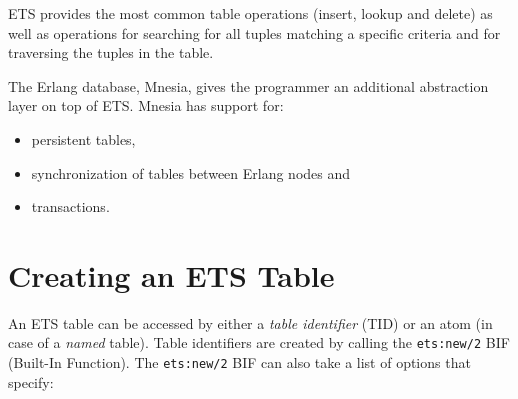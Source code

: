 \documentclass[aps,pre,preprint,nofootinbib]{revtex4}
\begin{document}
ETS provides the most common table operations (insert, lookup and delete) as well as operations for searching for all tuples matching a specific criteria and for traversing the tuples in the table.

The Erlang database, Mnesia, gives the programmer an additional abstraction layer on top of ETS. 
Mnesia has support for:
\begin{itemize}
 \item persistent tables,
 \item synchronization of tables between Erlang nodes and
 \item transactions.
\end{itemize}

\section{Creating an ETS Table}

An ETS table can be accessed by either a \emph{table identifier} (TID) or an atom (in case of a \emph{named} table).
Table identifiers are created by calling the \verb|ets:new/2| BIF (Built-In Function).
The \verb|ets:new/2| BIF can also take a list of options that specify:
\end{document}
